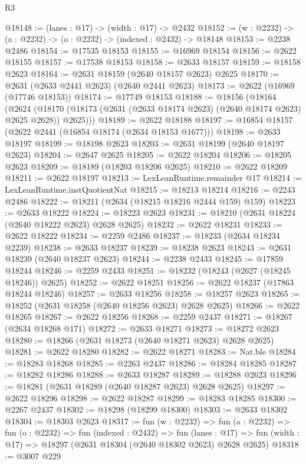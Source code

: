 \begin{lexlean}{R3}
\begin{coremodule}
@18148 := (lanes : @17) -> (width : @17) -> @2432
@18152 := (w : @2232) -> (a : @2232) -> (o : @2232) -> (indexed : @2432) -> @18148
@18153 := @2238 @2486
@18154 := @17535 @18153
@18155 := @16969 @18154
@18156 := @2622 @18155
@18157 := @17538 @18153
@18158 := @2633 @18157
@18159 := @18158 @2623
@18164 := @2631 @18159 (@2640 @18157 @2623) @2625
@18170 := @2631 (@2633 @2441 @2623) (@2640 @2441 @2623)
@18173 := @2622 (@16969 (@17746 @18153))
@18174 := @17749 @18153
@18188 := @18156
    (@18164
      (@2624 (@18170 (@18173 (@2631 (@2633 @18174 @2623) (@2640 @18174 @2623) @2625 @2628)) @2625)))
@18189 := @2622 @18188
@18197 := @16854 @18157 (@2622 @2441 (@16854 @18174 (@2634 @18153 @1677)))
@18198 := @2633 @18197
@18199 := @18198 @2623
@18203 := @2631 @18199 (@2640 @18197 @2623)
@18204 := @2647 @2625
@18205 := @2622 @18204
@18206 := @18205 @2623
@18209 := @18189 (@18203 @18206 @2625)
@18210 := @2622 @18209
@18211 := @2622 @18197
@18213 := LexLeanRuntime.remainder @17
@18214 := LexLeanRuntime.instQuotientNat
@18215 := @18213 @18214
@18216 := @2243 @2486
@18222 := @18211 (@2634 (@18215 @18216 @2444 @159) @159)
@18223 := @2633 @18222
@18224 := @18223 @2623
@18231 := @18210 (@2631 @18224 (@2640 @18222 @2623) @2628 @2625)
@18232 := @2622 @18231
@18233 := @2622 @18222
@18234 := @2259 @2486
@18237 := @18233 (@2634 @18234 @2239)
@18238 := @2633 @18237
@18239 := @18238 @2623
@18243 := @2631 @18239 (@2640 @18237 @2623)
@18244 := @2238 @2433
@18245 := @17859 @18244
@18246 := @2259 @2433
@18251 := @18232 (@18243 (@2627 (@18245 @18246)) @2625)
@18252 := @2622 @18251
@18256 := @2622 @18237 (@17863 @18244 @18246)
@18257 := @2633 @18256
@18258 := @18257 @2623
@18265 := @18252 (@2631 @18258 (@2640 @18256 @2623) @2628 @2625)
@18266 := @2622 @18265
@18267 := @2622 @18256
@18268 := @2259 @2437
@18271 := @18267 (@2634 @18268 @171)
@18272 := @2633 @18271
@18273 := @18272 @2623
@18280 := @18266 (@2631 @18273 (@2640 @18271 @2623) @2628 @2625)
@18281 := @2622 @18280
@18282 := @2622 @18271
@18283 := Nat.ble
@18284 := @18283 @18268
@18285 := @2263 @2437
@18286 := @18284 @18285
@18287 := @18282 @18286
@18288 := @2633 @18287
@18289 := @18288 @2623
@18296 := @18281 (@2631 @18289 (@2640 @18287 @2623) @2628 @2625)
@18297 := @2622 @18296
@18298 := @2622 @18287
@18299 := @18283 @18285
@18300 := @2267 @2437
@18302 := @18298 (@18299 @18300)
@18303 := @2633 @18302
@18304 := @18303 @2623
@18317 := fun (w : @2232) =>
  fun (a : @2232) =>
  fun (o : @2232) =>
  fun (indexed : @2432) =>
  fun (lanes : @17) => fun (width : @17) => @18297 (@2631 @18304 (@2640 @18302 @2623) @2628 @2625)
@18318 := @3007 @229

\end{coremodule}
\end{lexlean}
